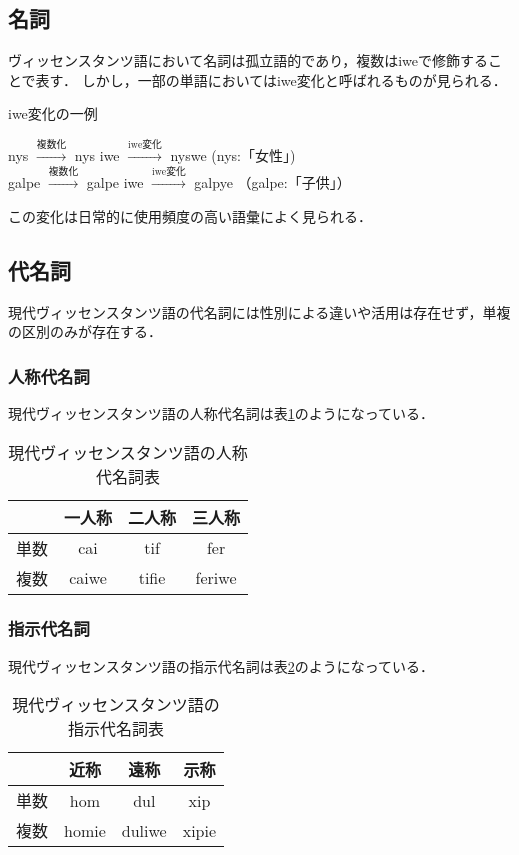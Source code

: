 \documentclass[a4paper,xelatex,ja=standard]{bxjsarticle}
\begin{document}
\subsection{名詞}
ヴィッセンスタンツ語において名詞は孤立語的であり，複数はiweで修飾することで表す．
しかし，一部の単語においてはiwe変化と呼ばれるものが見られる．
\begin{itembox}[l]{iwe変化の一例}
 \begin{center}
  nys $\xrightarrow{\text{複数化}}$ nys iwe $\xrightarrow{\text{iwe変化}}$  nyswe (nys:「女性」) \\
  galpe $\xrightarrow{\text{複数化}}$ galpe iwe $\xrightarrow{\text{iwe変化}}$ galpye （galpe:「子供」）
 \end{center}
\end{itembox}
この変化は日常的に使用頻度の高い語彙によく見られる．

\subsection{代名詞}
現代ヴィッセンスタンツ語の代名詞には性別による違いや活用は存在せず，単複の区別のみが存在する．

\subsubsection{人称代名詞}
現代ヴィッセンスタンツ語の人称代名詞は表\ref{vic_human_pronoum}のようになっている．
\begin{table}[htbp]
 \caption{現代ヴィッセンスタンツ語の人称代名詞表}
 \label{vic_human_pronoum}
 \begin{center}
  \begin{tabular}{|c||c|c|c|} \hline
   & 一人称 & 二人称 & 三人称 \\ \hline \hline
   単数 & cai & tif & fer \\ \hline
   複数 & caiwe & tifie & feriwe \\ \hline
  \end{tabular}
 \end{center}
\end{table}

\subsubsection{指示代名詞}
現代ヴィッセンスタンツ語の指示代名詞は表\ref{vic_obj_pronoum}のようになっている．
\begin{table}[htbp]
 \caption{現代ヴィッセンスタンツ語の指示代名詞表}
 \label{vic_obj_pronoum}
 \begin{center}
  \begin{tabular}{|c||c|c|c|} \hline
   & 近称 & 遠称 & 示称 \\ \hline \hline
   単数 & hom & dul & xip \\ \hline
   複数 & homie & duliwe & xipie \\ \hline
  \end{tabular}
 \end{center}
\end{table}
\end{document}
